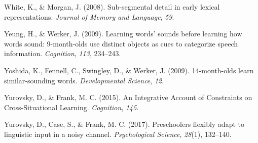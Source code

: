 \documentclass[english,,man,floatsintext]{apa6}
\theoremstyle{definition}
\theoremstyle{definition}
\theoremstyle{definition}
\theoremstyle{remark}
\begin{document}
\hypertarget{ref-white2008b}{}
White, K., \& Morgan, J. (2008). Sub-segmental detail in early lexical
representations. \emph{Journal of Memory and Language}, \emph{59}.

\hypertarget{ref-yeung09}{}
Yeung, H., \& Werker, J. (2009). Learning words' sounds before learning
how words sound: 9-month-olds use distinct objects as cues to categorize
speech information. \emph{Cognition}, \emph{113}, 234--243.

\hypertarget{ref-yoshida2009}{}
Yoshida, K., Fennell, C., Swingley, D., \& Werker, J. (2009).
14-month-olds learn similar-sounding words. \emph{Developmental
Science}, \emph{12}.

\hypertarget{ref-yurovsky2015}{}
Yurovsky, D., \& Frank, M. C. (2015). An Integrative Account of
Constraints on Cross-Situational Learning. \emph{Cognition}, \emph{145}.

\hypertarget{ref-yurovsky2017}{}
Yurovsky, D., Case, S., \& Frank, M. C. (2017). Preschoolers flexibly
adapt to linguistic input in a noisy channel. \emph{Psychological
Science}, \emph{28}(1), 132--140.
\end{document}
